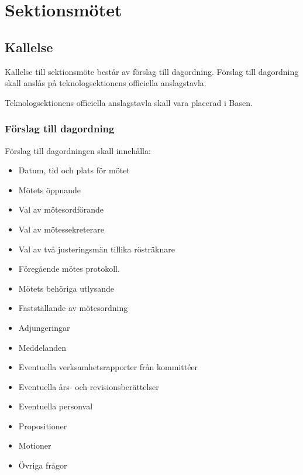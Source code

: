 \section{Sektionsmötet}

\subsection{Kallelse} 
Kallelse till sektionsmöte består av förslag till dagordning. Förslag till dagordning skall anslås på teknologsektionens officiella anslagstavla.

Teknologsektionens officiella anslagstavla skall vara placerad i Basen. 

\subsubsection{Förslag till dagordning}
Förslag till dagordningen skall innehålla:
\begin{itemize}  
  \item Datum, tid och plats för mötet 
  \item Mötets öppnande 
  \item Val av mötesordförande 
  \item Val av mötessekreterare 
  \item Val av två justeringsmän tillika rösträknare 
  \item Föregående mötes protokoll. 
  \item Mötets behöriga utlysande 
  \item Fastställande av mötesordning 
  \item Adjungeringar 
  \item Meddelanden 
  \item Eventuella verksamhetsrapporter från kommittéer 
  \item Eventuella års- och revisionsberättelser 
  \item Eventuella personval 
  \item Propositioner 
  \item Motioner 
  \item Övriga frågor 
\end{itemize}
